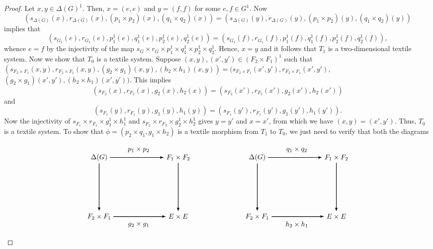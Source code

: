 \documentclass[a4paper,reqno,12pt]{amsart}
\theoremstyle{definition}
\theoremstyle{remark}
\begin{document}
\begin{proof}
Let $x,y\in \Delta(G)^1$. Then, $x=(e,e)$ and $y=(f,f)$ for some $e,f\in G^1$. Now \[\left(s_{\Delta(G)}(x),r_{\Delta(G)}(x),(p_1\times p_2)(x),(q_1\times q_2)(x)\right)=\left(s_{\Delta(G)}(y),r_{\Delta(G)}(y),(p_1\times p_2)(y),(q_1\times q_2)(y)\right)\] implies that \[(s_{G_1}(e),r_{G_1}(e),p_1^1(e),q_1^1(e),p_2^1(e),q_2^1(e))=(s_{G_1}(f),r_{G_1}(f),p_1^1(f),q_1^1(f),p_2^1(f),q_2^1(f)),\] whence $e=f$ by the injectivity of the map $s_G\times r_G\times p_1^1\times q_1^1\times p_2^1\times q_2^1$. Hence, $x=y$ and it follows that $T_1$ is a two-dimensional textile system. Now we show that $T_0$ is a textile system. Suppose $(x,y),(x',y')\in (F_2\times F_1)^1$ such that $\left(s_{F_2\times F_1}(x,y),r_{F_2\times F_1}(x,y),(g_2\times g_1)(x,y), (h_2\times h_1)(x,y)\right)=(s_{F_2\times F_1}(x',y'),r_{F_2\times F_1}(x',y'),$ $(g_2\times g_1)(x',y'), (h_2\times h_1)(x',y'))$. This implies \[(s_{F_2}(x),r_{F_2}(x),g_2(x),h_2(x))=(s_{F_2}(x'),r_{F_2}(x'),g_2(x'),h_2(x'))\] and \[(s_{F_1}(y),r_{F_1}(y),g_1(y),h_1(y))=(s_{F_1}(y'),r_{F_1}(y'),g_1(y'),h_1(y')).\] Now the injectivity of $s_{F_1}\times r_{F_1}\times g_1^1\times h_1^1$ and $s_{F_2}\times r_{F_2}\times g_2^1\times h_2^1$ gives $y=y'$ and $x=x'$, from which we have $(x,y)=(x',y')$. Thus, $T_0$ is a textile system. To show that $\phi=(p_2\times q_1,g_1\times h_2)$ is a textile morphism from $T_1$ to $T_0$, we just need to verify that both the diagrams 

\[
\begin{tikzpicture}[scale=2.0]
\node[] (A1) at (0,0) {$\Delta(G)$};
\node[] (A2) at (2,0) {$F_1\times F_2$};
\node[] (A3) at (4,0) {$\Delta(G)$};
\node[] (A4) at (6,0) {$F_1\times F_2$};

\node[] (B1) at (0,-1.5) {$F_2\times F_1$};
\node[] (B2) at (2,-1.5) {$E\times E$};
\node[] (B3) at (4,-1.5) {$F_2\times F_1$};
\node[] (B4) at (6,-1.5) {$E\times E$};


\path[->, >=latex,thick] (A1) edge [] node[]{} (A2);
\path[->, >=latex,thick] (B1) edge [] node[]{} (B2);
\path[->, >=latex,thick] (A3) edge [] node[]{} (A4);
\path[->, >=latex,thick] (B3) edge [] node[]{} (B4);

\path[->, >=latex,thick] (A1) edge [] node[]{} (B1);
\path[->, >=latex,thick] (A2) edge [] node[]{} (B2);
\path[->, >=latex,thick] (A3) edge [] node[]{} (B3);
\path[->, >=latex,thick] (A4) edge [] node[]{} (B4);

\node at (1,0.2) {$p_1\times p_2$};
\node at (5,0.2) {$q_1\times q_2$};
\node at (1,-1.7) {$g_2\times g_1$};
\node at (5,-1.7) {$h_2\times h_1$};


\end{tikzpicture}\]
\end{proof}
\end{document}
